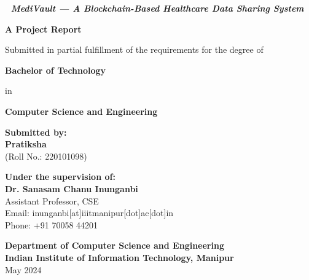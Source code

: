 \documentclass[a4paper, 11pt, oneside]{report}
\begin{document}
\begin{titlepage}
    \centering
    \vspace*{1cm}
    {\Huge \bfseries \textit{🌿 MediVault — A Blockchain-Based Healthcare Data Sharing System}}

    \vspace{1.5cm}

    {\Large \bfseries A Project Report}

    \vspace{1cm}

    {\large Submitted in partial fulfillment of the requirements for the degree of}

    \vspace{0.5cm}

    {\Large \bfseries Bachelor of Technology}

    \vspace{0.5cm}

    {\large in}

    \vspace{0.5cm}

    {\Large \bfseries Computer Science and Engineering}

    \vfill

    {\large \bfseries Submitted by:} \\
    {\Large \bfseries Pratiksha} \\
    {\large (Roll No.: 220101098)}

    \vspace{1.5cm}

    {\large \bfseries Under the supervision of:} \\
    {\Large \bfseries Dr. Sanasam Chanu Inunganbi} \\
    {\large Assistant Professor, CSE} \\
    {\large Email: inunganbi[at]iiitmanipur[dot]ac[dot]in} \\
    {\large Phone: +91 70058 44201}

    \vspace{2cm}

    {\large \bfseries Department of Computer Science and Engineering} \\
    {\large \bfseries Indian Institute of Information Technology, Manipur} \\
    {\large May 2024}

\end{titlepage}

\end{document}
